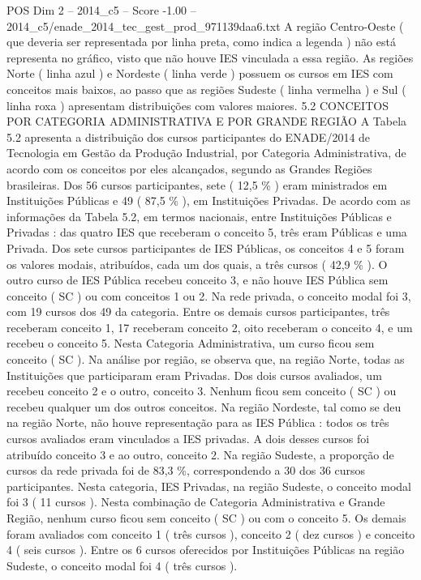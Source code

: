 \begin{textsample}{POS Dim 2 – 2014\_c5 – Score -1.00 – 2014\_c5/enade\_2014\_tec\_gest\_prod\_971139daa6.txt}
A região Centro-Oeste ( que deveria ser representada por linha preta, como indica a legenda ) não está representa no gráfico, visto que não houve IES vinculada a essa região.
As regiões Norte ( linha azul ) e Nordeste ( linha verde ) possuem os cursos em IES com conceitos mais baixos, ao passo que as regiões Sudeste ( linha vermelha ) e Sul ( linha roxa ) apresentam distribuições com valores maiores. 5.2 CONCEITOS POR CATEGORIA ADMINISTRATIVA E POR GRANDE REGIÃO A Tabela 5.2 apresenta a distribuição dos cursos participantes do ENADE/2014 de Tecnologia em Gestão da Produção Industrial, por Categoria Administrativa, de acordo com os conceitos por eles alcançados, segundo as Grandes Regiões brasileiras.
Dos 56 cursos participantes, sete ( 12,5 \% ) eram ministrados em Instituições Públicas e 49 ( 87,5 \% ), em Instituições Privadas.
De acordo com as informações da Tabela 5.2, em termos nacionais, entre Instituições Públicas e Privadas : das quatro IES que receberam o conceito 5, três eram Públicas e uma Privada.
Dos sete cursos participantes de IES Públicas, os conceitos 4 e 5 foram os valores modais, atribuídos, cada um dos quais, a três cursos ( 42,9 \% ).
O outro curso de IES Pública recebeu conceito 3, e não houve IES Pública sem conceito ( SC ) ou com conceitos 1 ou 2.
Na rede privada, o conceito modal foi 3, com 19 cursos dos 49 da categoria.
Entre os demais cursos participantes, três receberam conceito 1, 17 receberam conceito 2, oito receberam o conceito 4, e um recebeu o conceito 5.
Nesta Categoria Administrativa, um curso ficou sem conceito ( SC ).
Na análise por região, se observa que, na região Norte, todas as Instituições que participaram eram Privadas.
Dos dois cursos avaliados, um recebeu conceito 2 e o outro, conceito 3.
Nenhum ficou sem conceito ( SC ) ou recebeu qualquer um dos outros conceitos.
Na região Nordeste, tal como se deu na região Norte, não houve representação para as IES Pública : todos os três cursos avaliados eram vinculados a IES privadas.
A dois desses cursos foi atribuído conceito 3 e ao outro, conceito 2.
Na região Sudeste, a proporção de cursos da rede privada foi de 83,3 \%, correspondendo a 30 dos 36 cursos participantes.
Nesta categoria, IES Privadas, na região Sudeste, o conceito modal foi 3 ( 11 cursos ).
Nesta combinação de Categoria Administrativa e Grande Região, nenhum curso ficou sem conceito ( SC ) ou com o conceito 5.
Os demais foram avaliados com conceito 1 ( três cursos ), conceito 2 ( dez cursos ) e conceito 4 ( seis cursos ).
Entre os 6 cursos oferecidos por Instituições Públicas na região Sudeste, o conceito modal foi 4 ( três cursos ).

\end{textsample}
